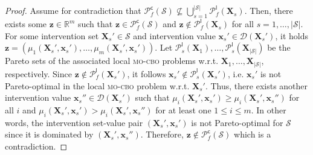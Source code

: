 \begin{proof}
    Assume for contradiction that $\mathcal{P}_f^{\textsf{c}}(\mathcal{S}) \not\subseteq \bigcup_{s=1}^{|\mathcal{S}|} \mathcal{P}_f^{\textsf{l}}(\mathbf{X}_s)$. Then, there exists some $\mathbf{z} \in \mathbb{R}^m$ such that $\mathbf{z} \in \mathcal{P}_f^{\textsf{c}}(\mathcal{S})$ and $\mathbf{z} \not\in \mathcal{P}_f^{\textsf{l}}(\mathbf{X}_{s})$ for all $s = 1, \dots, |\mathcal{S}|$. For some intervention set $\mathbf{X}_{s}' \in \mathcal{S}$ and intervention value $\mathbf{x}_s' \in \mathcal{D}(\mathbf{X}_s')$, it holds $\mathbf{z} = (\mu_1(\mathbf{X}_s',\mathbf{x}_s'),\dots,\mu_m(\mathbf{X}_s',\mathbf{x}_s'))$. Let $\mathcal{P}_s^{\textsf{l}}(\mathbf{X}_1),\dots,\mathcal{P}_s^{\textsf{l}}(\mathbf{X}_{|\mathcal{S}|})$ be the Pareto sets of the associated local \textsc{mo-cbo} problems w.r.t. $\mathbf{X}_1,\dots,\mathbf{X}_{|\mathcal{S}|}$, respectively. Since $\mathbf{z} \not\in \mathcal{P}_f^{\textsf{l}}(\mathbf{X}_s')$, it follows $\mathbf{x}_s' \not\in \mathcal{P}_s^{\textsf{l}}(\mathbf{X}_s')$, i.e. $\mathbf{x}_s'$ is not Pareto-optimal in the local \textsc{mo-cbo} problem w.r.t. $\mathbf{X}_s'$. Thus, there exists another intervention value $\mathbf{x}_s'' \in \mathcal{D}(\mathbf
    {X}_s')$ such that $\mu_i(\mathbf{X}_s',\mathbf{x}_s') \geq \mu_i(\mathbf{X}_s',\mathbf{x}_s'')$ for all $i$ and $\mu_i(\mathbf{X}_s',\mathbf{x}_s') > \mu_i(\mathbf{X}_s',\mathbf{x}_s'')$ for at least one $1 \leq i \leq m$. In other words, the intervention set-value pair $(\mathbf{X}_s',\mathbf{x}_s')$ is not Pareto-optimal for $\mathcal{S}$ since it is dominated by $(\mathbf{X}_s',\mathbf{x}_s'')$. Therefore, $\mathbf{z} \not\in \mathcal{P}_f^{\textsf{c}}(\mathcal{S})$ which is a contradiction.
\end{proof}
